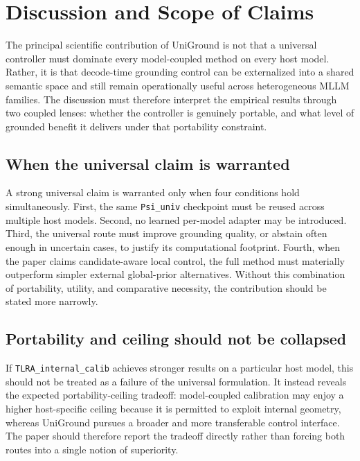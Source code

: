 \section{Discussion and Scope of Claims}
\label{sec:discussion}

The principal scientific contribution of UniGround is not that a universal controller must dominate every model-coupled method on every host model. Rather, it is that decode-time grounding control can be externalized into a shared semantic space and still remain operationally useful across heterogeneous MLLM families. The discussion must therefore interpret the empirical results through two coupled lenses: whether the controller is genuinely portable, and what level of grounded benefit it delivers under that portability constraint.

\subsection{When the universal claim is warranted}

A strong universal claim is warranted only when four conditions hold simultaneously. First, the same \texttt{Psi\_univ} checkpoint must be reused across multiple host models. Second, no learned per-model adapter may be introduced. Third, the universal route must improve grounding quality, or abstain often enough in uncertain cases, to justify its computational footprint. Fourth, when the paper claims candidate-aware local control, the full method must materially outperform simpler external global-prior alternatives. Without this combination of portability, utility, and comparative necessity, the contribution should be stated more narrowly.

\subsection{Portability and ceiling should not be collapsed}

If \texttt{TLRA\_internal\_calib} achieves stronger results on a particular host model, this should not be treated as a failure of the universal formulation. It instead reveals the expected portability-ceiling tradeoff: model-coupled calibration may enjoy a higher host-specific ceiling because it is permitted to exploit internal geometry, whereas UniGround pursues a broader and more transferable control interface. The paper should therefore report the tradeoff directly rather than forcing both routes into a single notion of superiority.

